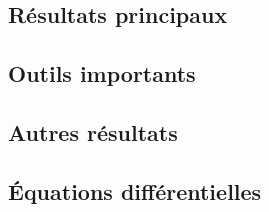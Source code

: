 \documentclass[11pt,a4paper]{article}
\begin{document}
\subsection*{Résultats principaux}


\subsection*{Outils importants}


\subsection*{Autres résultats}

\newpage
\begin{center}  
\section*{Équations différentielles} 
\end{center}


\end{document}
